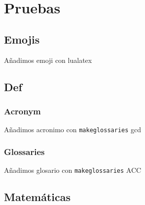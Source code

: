 \chapter*{Pruebas}

\section*{Emojis}

Añadimos emoji con lualatex 

\section*{Def}

\subsection*{Acronym}

Añadimos acronimo con \texttt{makeglossaries} \acrshort{gcd}

\subsection*{Glossaries}

Añadimos glosario con \texttt{makeglossaries} \gls{ACC}

\section*{Matemáticas}

% 